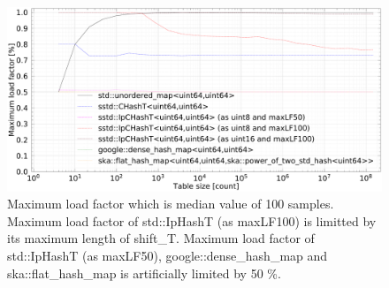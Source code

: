 




\begin{figure}[h]
  \includegraphics[scale=0.24]{./fig_bench_sm/maxLoadFactor_med.pdf}
  \caption{
    Maximum load factor which is median value of 100 samples.
    Maximum load factor of std::IpHashT (as maxLF100) is limitted by its maximum length of shift\_T.
    Maximum load factor of std::IpHashT (as maxLF50), google::dense\_hash\_map and ska::flat\_hash\_map is artificially limited by 50 \%.
  }
  \label{fig_bench_LF}
\end{figure}


